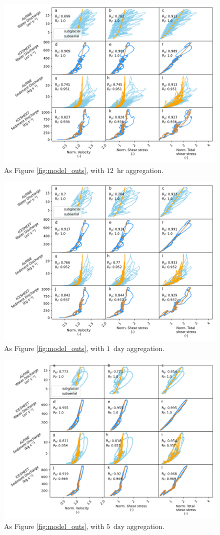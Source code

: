 \documentclass[11pt]{article}
\newcommand{\unit}[1]{$\mathrm{#1}$}
\begin{document}
\begin{center}
  \begin{figure}[h]
    \includegraphics[width=0.7\linewidth]{Fig3_12hr.png}
    \caption{As Figure \ref{fig:model_outs}, with $12$ \,\unit{hr} aggregation.}
    \label{fig:model_outs_12hr}
  \end{figure}
\end{center}


\begin{center}
  \begin{figure}[h]
    \includegraphics[width=0.7\linewidth]{Fig3_1day.png}
    \caption{As Figure \ref{fig:model_outs}, with $1$ \,\unit{day} aggregation.}
    \label{fig:model_outs_1day}
  \end{figure}
\end{center}


\begin{center}
  \begin{figure}[h]
    \includegraphics[width=0.7\linewidth]{Fig3_5day.png}
    \caption{As Figure \ref{fig:model_outs}, with $5$ \,\unit{day} aggregation.}
    \label{fig:model_outs_5day}
  \end{figure}
\end{center}
\end{document}
